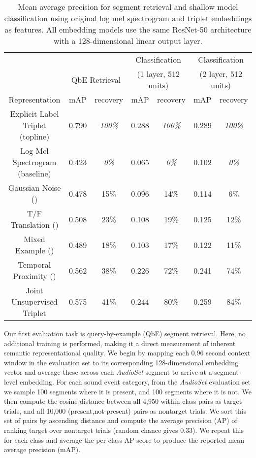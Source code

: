 \documentclass{article}
\begin{document}
\begin{table*}[t]
\vspace{-0.2cm}
  \centering
  \caption{Mean average precision for segment retrieval and shallow model
    classification using original log mel spectrogram and triplet embeddings as
    features. All embedding models use the same ResNet-50 architecture with a
    128-dimensional linear output layer.}
  \label{tab:results}
  \vspace{0.2cm}
  \begin{tabular}{c|c|c|c|c|c|c}
    \hline \hline
    & \multicolumn{2}{c|}{} & \multicolumn{2}{c|}{Classification} & \multicolumn{2}{c}{Classification}\\
    & \multicolumn{2}{c|}{QbE Retrieval} & \multicolumn{2}{c|}{(1 layer, 512 units)} &
    \multicolumn{2}{c}{(2 layer, 512 units)}\\
    \cline{2-7}
    Representation & mAP & recovery & mAP & recovery & mAP & recovery\\
    \hline \hline
    Explicit Label Triplet (topline)  & 0.790 & \emph{100\%} & 0.288 & \emph{100\%} & 0.289 & \emph{100\%} \\
    Log Mel Spectrogram (baseline) & 0.423 & \emph{0\%}   & 0.065 & \emph{0\%}   & 0.102 &   \emph{0\%}\\
    \hline 
    Gaussian Noise ()  & 0.478 & 15\%         & 0.096 & 14\%  & 0.114 &   6\%\\
    T/F Translation ()       & 0.508 & 23\%         & 0.108 & 19\%  & 0.125 &  12\%\\
    Mixed Example ()  & 0.489 & 18\%         & 0.103 & 17\%  & 0.122 &  11\%\\
    Temporal Proximity () & 0.562 & 38\%  & 0.226 & 72\%  & 0.241 &  74\%\\
    \hline 
    Joint Unsupervised Triplet         & 0.575 & 41\%         & 0.244 & 80\%  & 0.259 &  84\%\\
    \hline  \hline
  \end{tabular}
\vspace{-0.2cm}
\end{table*}

Our first evaluation task is query-by-example (QbE) segment retrieval.  Here, no
additional training is performed, making it a direct measurement of inherent
semantic representational quality.  We begin by mapping each 0.96 second context
window in the evaluation set to its corresponding 128-dimensional embedding
vector and average these across each \emph{AudioSet} segment to arrive at a
segment-level embedding.  For each sound event category, from the
\emph{AudioSet} evaluation set we sample 100 segments where it is present, and
100 segments where it is not.  We then compute the cosine distance between all
4,950 within-class pairs as target trials, and all 10,000 (present,not-present)
pairs as nontarget trials.  We sort this set of pairs by ascending distance and
compute the average precision (AP) of ranking target over nontarget trials
(random chance gives 0.33).  We repeat this for each class and average the
per-class AP score to produce the reported mean average precision (mAP).
\end{document}
